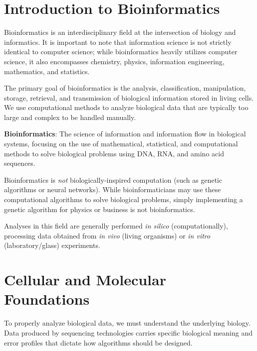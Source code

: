 


\section{Introduction to Bioinformatics}

Bioinformatics is an interdisciplinary field at the intersection of biology and informatics. It is important to note that information science is not strictly identical to computer science; while bioinformatics heavily utilizes computer science, it also encompasses chemistry, physics, information engineering, mathematics, and statistics. 

The primary goal of bioinformatics is the analysis, classification, manipulation, storage, retrieval, and transmission of biological information stored in living cells. We use computational methods to analyze biological data that are typically too large and complex to be handled manually. 

\begin{important}
  \textbf{Bioinformatics}: The science of information and information flow in biological systems, focusing on the use of mathematical, statistical, and computational methods to solve biological problems using DNA, RNA, and amino acid sequences.
\end{important}

\sta Bioinformatics is \textit{not} biologically-inspired computation (such as genetic algorithms or neural networks). While bioinformaticians may use these computational algorithms to solve biological problems, simply implementing a genetic algorithm for physics or business is not bioinformatics.

Analyses in this field are generally performed \textit{in silico} (computationally), processing data obtained from \textit{in vivo} (living organisms) or \textit{in vitro} (laboratory/glass) experiments.

\section{Cellular and Molecular Foundations}

To properly analyze biological data, we must understand the underlying biology. Data produced by sequencing technologies carries specific biological meaning and error profiles that dictate how algorithms should be designed.


